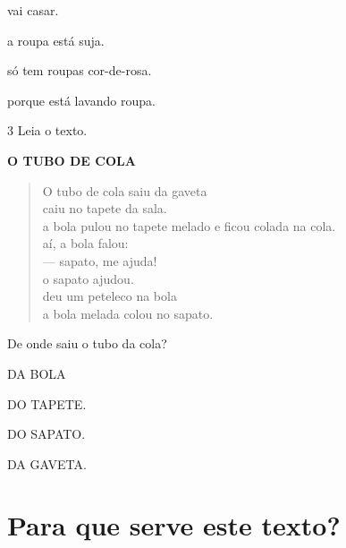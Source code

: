 \begin{escolha}
	\item vai casar.

	\item a roupa está suja.

	\item só tem roupas cor-de-rosa.

	\item porque está lavando roupa.
\end{escolha}

\num{3} Leia o texto.

\textbf{O TUBO DE COLA}

\begin{verse}
O tubo de cola saiu da gaveta\\
caiu no tapete da sala.\\
a bola pulou no tapete melado e ficou colada na cola.\\
aí, a bola falou:\\
--- sapato, me ajuda!\\
o sapato ajudou.\\
deu um peteleco na bola\\
a bola melada colou no sapato.
\end{verse}



De onde saiu o tubo da cola?

\begin{escolha}
\item DA BOLA

\item DO TAPETE.

\item DO SAPATO.

\item DA GAVETA.
\end{escolha}

\chapter{Para que serve este texto?}


